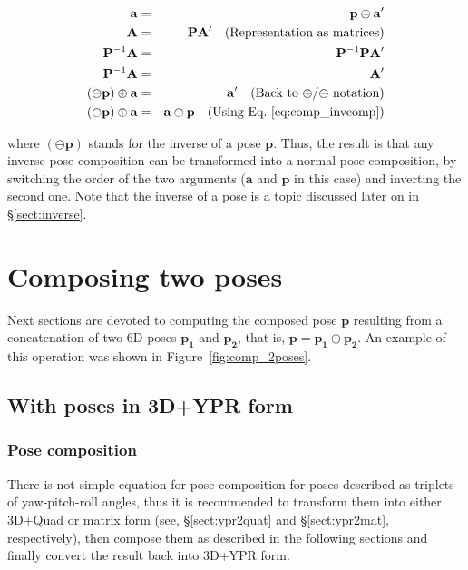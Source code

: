 \documentclass[a4paper,10pt]{report}
\begin{document}
\begin{eqnarray*}
 \mathbf{a} &=& \mathbf{p} \oplus \mathbf{a'}    \\
 \mathbf{A} &=& \mathbf{P}  \mathbf{A'}  \quad \text{(Representation as matrices)}  \\
 \mathbf{P}^{-1} \mathbf{A} &=& \mathbf{P}^{-1} \mathbf{P}  \mathbf{A'} \\
 \mathbf{P}^{-1} \mathbf{A} &=& \mathbf{A'}  \\
 (\ominus \mathbf{p}) \oplus \mathbf{a} &=& \mathbf{a'}  \quad \text{(Back to $\oplus$/$\ominus$ notation)} \\
 (\ominus \mathbf{p}) \oplus \mathbf{a} &=& \mathbf{a} \ominus \mathbf{p}  \quad \text{(Using Eq.~\ref{eq:comp_invcomp})}
\end{eqnarray*}

\noindent where $(\ominus \mathbf{p})$ stands for the inverse of a pose $\mathbf{p}$. 
Thus, the result is that any inverse pose composition can be transformed into a normal 
pose composition, by switching the order of the two arguments
($\mathbf{a}$ and $\mathbf{p}$ in this case) and inverting the second one.
Note that the inverse of a pose is a topic discussed later on in \S \ref{sect:inverse}.


\chapter{Composing two poses}

Next sections are devoted to computing the composed pose $\mathbf{p}$ resulting
from a concatenation of two 6D poses $\mathbf{p_1}$ and $\mathbf{p_2}$, 
that is, $\mathbf{p} = \mathbf{p_1} \oplus \mathbf{p_2}$. 
An example of this operation was shown in Figure~\ref{fig:comp_2poses}.

\section{With poses in 3D+YPR form}

\subsection{Pose composition}

There is not simple
equation for pose composition for poses described as triplets 
of yaw-pitch-roll angles, thus it is recommended to transform them into 
either 3D+Quad or matrix form 
(see, \S \ref{sect:ypr2quat} and \S \ref{sect:ypr2mat}, respectively), 
then compose them as described in the following sections and finally
convert the result back into 3D+YPR form.
\end{document}
